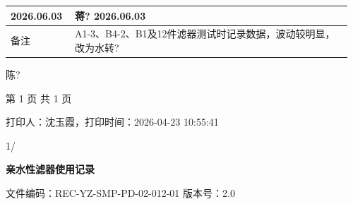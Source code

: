 \documentclass[UTF8,10pt,a4paper,fontset=fandol]{ctexart}
\newcommand{\fieldvalue}[1]{#1}
\newcommand{\handwritten}[1]{#1}
\begin{document}
\begin{tabular}{|p{0.18\linewidth}|p{0.30\linewidth}|p{0.18\linewidth}|p{0.30\linewidth}|}
\fieldvalue{\handwritten{2026.06.03}} &
\fieldvalue{\handwritten{蒋?}}\quad
\fieldvalue{\handwritten{2026.06.03}}\\
\hline
备注 &
\multicolumn{3}{p{0.78\linewidth}|}{
\fieldvalue{\handwritten{A1-3、B4-2、B1及12件滤器测试时记录数据，波动较明显，改为水转?}}
}\\
\hline
\end{tabular}

\begin{flushright}
\handwritten{陈?}
\end{flushright}

\noindent
第 1 页 共 1 页

\noindent
打印人：沈玉霞，打印时间：2026-04-23 10:55:41

\begin{flushright}
\handwritten{1/}
\end{flushright}

\newpage

\begin{center}
\textbf{亲水性滤器使用记录}
\end{center}

\noindent
文件编码：REC-YZ-SMP-PD-02-012-01 \qquad 版本号：2.0
\end{document}
